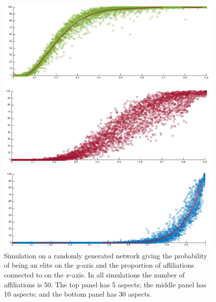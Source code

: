 \begin{subappendices}
\begin{figure}[h!]
\begin{center}
\includegraphics[scale=0.5]{Images/RandSim1.jpg}
\end{center}
\caption[Probability distribution of a random node being an elite]{Simulation on a randomly generated network giving the probability of being an elite on the $y$-axis and the proportion of affiliations connected to on the $x$-axis. In all simulations the number of affiliations is 50. The top panel has 5 aspects; the middle panel has 10 aspects; and the bottom panel has 30 aspects.}
\label{RandSim1}
\end{figure}
\end{subappendices}
